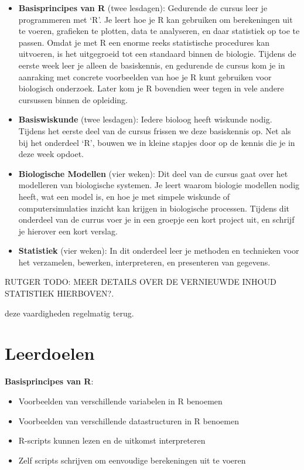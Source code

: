 \documentclass[
  a4paper,
]{scrbook}
\providecommand{\tightlist}{%
  \setlength{\itemsep}{0pt}\setlength{\parskip}{0pt}}\usepackage{longtable,booktabs,array}
\theoremstyle{definition}
\theoremstyle{remark}
\begin{document}
\begin{itemize}
\tightlist
\item
  \textbf{Basisprincipes van R} (twee lesdagen): Gedurende de cursus
  leer je programmeren met `R'. Je leert hoe je R kan gebruiken om
  berekeningen uit te voeren, grafieken te plotten, data te analyseren,
  en daar statistiek op toe te passen. Omdat je met R een enorme reeks
  statistische procedures kan uitvoeren, is het uitgegroeid tot een
  standaard binnen de biologie. Tijdens de eerste week leer je alleen de
  basiskennis, en gedurende de cursus kom je in aanraking met concrete
  voorbeelden van hoe je R kunt gebruiken voor biologisch onderzoek.
  Later kom je R bovendien weer tegen in vele andere cursussen binnen de
  opleiding.
\item
  \textbf{Basiswiskunde} (twee lesdagen): Iedere bioloog heeft wiskunde
  nodig. Tijdens het eerste deel van de cursus frissen we deze
  basiskennis op. Net als bij het onderdeel `R', bouwen we in kleine
  stapjes door op de kennis die je in deze week opdoet.
\item
  \textbf{Biologische Modellen} (vier weken): Dit deel van de cursus
  gaat over het modelleren van biologische systemen. Je leert waarom
  biologie modellen nodig heeft, wat een model is, en hoe je met simpele
  wiskunde of computersimulaties inzicht kan krijgen in biologische
  processen. Tijdens dit onderdeel van de currus voer je in een groepje
  een kort project uit, en schrijf je hierover een kort verslag.
\item
  \textbf{Statistiek} (vier weken): In dit onderdeel leer je methoden en
  technieken voor het verzamelen, bewerken, interpreteren, en
  presenteren van gegevens.
\end{itemize}

RUTGER TODO: MEER DETAILS OVER DE VERNIEUWDE INHOUD STATISTIEK
HIERBOVEN?.

deze vaardigheden regelmatig terug.

\section{Leerdoelen}\label{leerdoelen}

\textbf{Basisprincipes van R}:

\begin{itemize}
\tightlist
\item
  Voorbeelden van verschillende variabelen in R benoemen
\item
  Voorbeelden van verschillende datastructuren in R benoemen
\item
  R-scripts kunnen lezen en de uitkomst interpreteren
\item
  Zelf scripts schrijven om eenvoudige berekeningen uit te voeren
\end{itemize}
\end{document}
